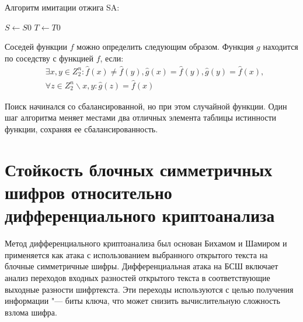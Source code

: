 Алгоритм имитации отжига SA:

\begin{algorithm}
    \SetAlgoNoLine
    $S \leftarrow S0$\;
    $T \leftarrow T0$\;
\end{algorithm}

Соседей функции $f$ можно определить следующим образом. Функция $g$ находится по
соседству с функцией $f$, если:
\begin{equation}\begin{split}
&\exists x,y \in Z^{n}_{2}: \hat{f}(x) \neq \hat{f}(y), \hat{g}(x) = \hat{f}(y), \hat{g}(y) = \hat{f}(x), \\ 
&\forall z \in Z^{n}_{2} \backslash {x,y}: \hat{g}(z) = \hat{f}(x)
\end{split}\end{equation}

Поиск начинался со сбалансированной, но при этом случайной функции. Один шаг
алгоритма меняет местами два отличных элемента таблицы истинности функции,
сохраняя ее сбалансированность.

\section{Стойкость блочных симметричных шифров относительно дифференциального криптоанализа}

Метод дифференциального криптоанализа был основан Бихамом и Шамиром и
применяется как атака с использованием выбранного открытого текста на блочные
симметричные шифры. Дифференциальная атака на БСШ включает анализ переходов
входных разностей открытого текста в соответствующие выходные разности
шифртекста. Эти переходы используются с целью получения информации "--- биты
ключа, что может снизить вычислительную сложность взлома шифра.

